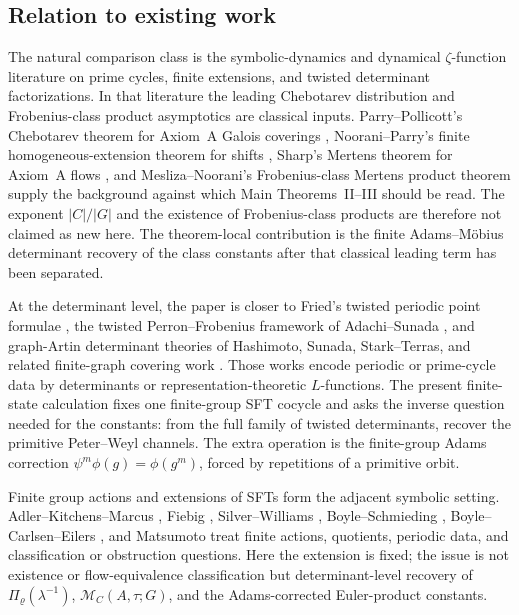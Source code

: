 \documentclass[11pt,a4paper]{amsart}
\theoremstyle{plain}
\theoremstyle{definition}
\theoremstyle{remark}
\begin{document}
\subsection{Relation to existing work}

The natural comparison class is the symbolic-dynamics and dynamical
\(\zeta\)-function literature on prime cycles, finite extensions, and
twisted determinant factorizations.  In that literature the leading
Chebotarev distribution and Frobenius-class product asymptotics are
classical inputs.  Parry--Pollicott's Chebotarev theorem for Axiom~A
Galois coverings \cite{ParryPollicott1986Chebotarev}, Noorani--Parry's
finite homogeneous-extension theorem for shifts
\cite{NooraniParry1992ChebotarevShifts}, Sharp's Mertens theorem for
Axiom~A flows \cite{Sharp1991Mertens}, and Mesliza--Noorani's
Frobenius-class Mertens product theorem
\cite{MeslizaNoorani1999FrobeniusMertens} supply the background against
which Main Theorems~II--III should be read.  The exponent
\(|C|/|G|\) and the existence of Frobenius-class products are therefore
not claimed as new here.  The theorem-local contribution is the finite
Adams--M\"obius determinant recovery of the class constants after that
classical leading term has been separated.

At the determinant level, the paper is closer to Fried's twisted periodic
point formulae \cite{Fried1983PeriodicPointsTwistedCoefficients,Fried1983HomologicalIdentitiesClosedOrbits}, the twisted
Perron--Frobenius framework of Adachi--Sunada
\cite{AdachiSunada1987TwistedPF}, and graph-Artin determinant theories of
Hashimoto, Sunada, Stark--Terras, and related finite-graph covering work
\cite{Hashimoto1989ZetaFiniteGraphs,Hashimoto1990ZetaLFunctionsFiniteGraphs,Hashimoto1992ArtinDensityPrimeCycles,Sunada1986LFunctionsGeometry,StarkTerras1996FiniteGraphsCoverings,StarkTerras2000FiniteGraphsCoveringsII,StarkTerras2007FiniteGraphsCoveringsIII}.  Those works encode periodic
or prime-cycle data by determinants or representation-theoretic
\(L\)-functions.  The present finite-state calculation fixes one
finite-group SFT cocycle and asks the inverse question needed for the
constants: from the full family of twisted determinants, recover the
primitive Peter--Weyl channels.  The extra operation is the finite-group
Adams correction \(\psi^m\phi(g)=\phi(g^m)\), forced by repetitions of a
primitive orbit.

Finite group actions and extensions of SFTs form the adjacent symbolic
setting.  Adler--Kitchens--Marcus \cite{AdlerKitchensMarcus1985FiniteGroupActions},
Fiebig \cite{Fiebig1993PeriodicFiniteGroupActions}, Silver--Williams
\cite{SilverWilliams2005InvariantFiniteGroupActions}, Boyle--Schmieding
\cite{BoyleSchmieding2017FiniteGroupExtensions}, Boyle--Carlsen--Eilers
\cite{BoyleCarlsenEilers2020FlowEquivalenceGSFT}, and Matsumoto
\cite{Matsumoto2016ExtensionsSubshiftsFiniteGroups} treat finite actions,
quotients, periodic data, and classification or obstruction questions.
Here the extension is fixed; the issue is not existence or
flow-equivalence classification but determinant-level recovery of
\(\Pi_\varrho(\lambda^{-1})\), \(\mathcal M_C(A,\tau;G)\), and the
Adams-corrected Euler-product constants.
\end{document}
